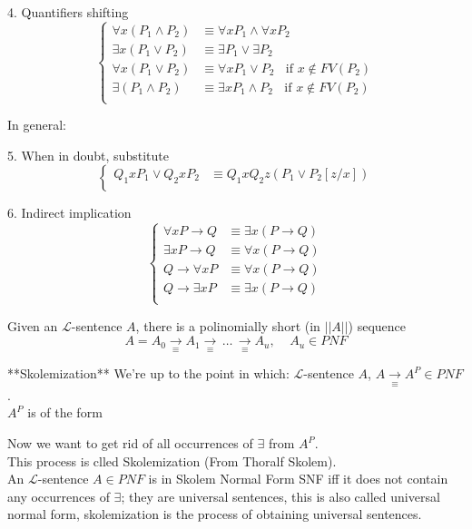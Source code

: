 4. Quantifiers shifting
$$ 
\begin{cases}
	\forall x (P_1 \wedge P_2) & \equiv \forall x P_1 \wedge \forall x P_2 \\
	\exists x (P_1 \vee P_2) & \equiv \exists P_1 \vee \exists P_2 \\
	\forall x (P_1 \vee P_2) & \equiv \forall x P_1 \vee P_2 \;\; \text{ if } x \notin FV(P_2) \\
	\exists (P_1 \wedge P_2) & \equiv \exists x P_1 \wedge P_2 \;\; \text{ if } x \notin FV(P_2) \\ 
\end{cases}
$$

In general: 
$$
$$

5. When in doubt, substitute
$$ 
\begin{cases}
	Q_1 x P_1 \vee Q_2 x P_2 & \equiv Q_1 x Q_2 z (P_1 \vee P_2 [z/x]) \\
\end{cases}
$$

6. Indirect implication
$$ 
\begin{cases}
	\forall x P \rightarrow Q & \equiv \exists x (P \rightarrow Q) \\
	\exists x P \rightarrow Q & \equiv \forall x (P \rightarrow Q) \\
	Q \rightarrow \forall x P & \equiv \forall x (P \rightarrow Q) \\
	Q \rightarrow \exists x P & \equiv \exists x (P \rightarrow Q) \\
\end{cases}
$$

Given an $\mathcal{L}$-sentence $A$, there is a polinomially short (in $||A||$) sequence 
$$ A = A_0 \xrightarrow[\equiv]{} A_1 \xrightarrow[\equiv]{} \, \dots \, \xrightarrow[\equiv]{} A_u, \;\;\;\; A_u \in PNF $$


**Skolemization**
We're up to the point in which:
$\mathcal{L}$-sentence $A$, $A \xrightarrow[\equiv]{} A^P \in PNF$.\\
$A^P$ is of the form $ $ %

Now we want to get rid of all occurrences of $\exists$ from $A^P$.\\

This process is clled Skolemization (From Thoralf Skolem).\\

An $\mathcal{L}$-sentence $A \in PNF$ is in Skolem Normal Form SNF iff it does not contain any occurrences of $\exists$; they are universal sentences, this is also called universal normal form, skolemization is the process of obtaining universal sentences.\\

